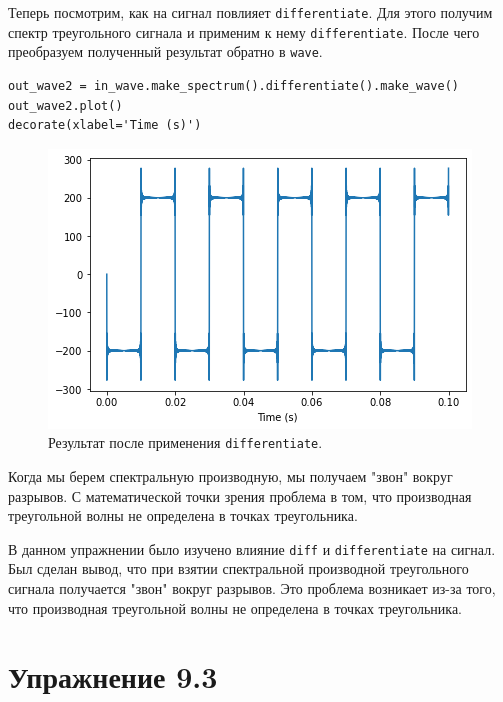 \documentclass[a4paper, 14pt]{extarticle}
\begin{document}
    Теперь посмотрим, как на сигнал повлияет \texttt{differentiate}. Для этого получим спектр треугольного сигнала и
    применим к нему \texttt{differentiate}. После чего преобразуем полученный результат обратно в \texttt{wave}.

    \begin{lstlisting}[caption= Применение \texttt{differentiate}., label={lst:task2_out_differentiate}]
out_wave2 = in_wave.make_spectrum().differentiate().make_wave()
out_wave2.plot()
decorate(xlabel='Time (s)')     \end{lstlisting}

    \begin{figure}[H]
        \centering
        \includegraphics[width=0.7\linewidth]{resources/Images/task2_out_differentiate}
        \caption{Результат после применения \texttt{differentiate}.}
        \label{fig:task2_out_differentiate}
    \end{figure}

    Когда мы берем спектральную производную, мы получаем "звон" вокруг разрывов.
    С математической точки зрения проблема в том, что производная треугольной волны не определена в точках треугольника.

    В данном упражнении было изучено влияние \texttt{diff} и \texttt{differentiate} на сигнал.
    Был сделан вывод, что при взятии спектральной производной треугольного сигнала получается "звон" вокруг разрывов.
    Это проблема возникает из-за того, что производная треугольной волны не определена в точках треугольника.

    \newpage

    \section{Упражнение 9.3}
    \label{sec:task3}
\end{document}
